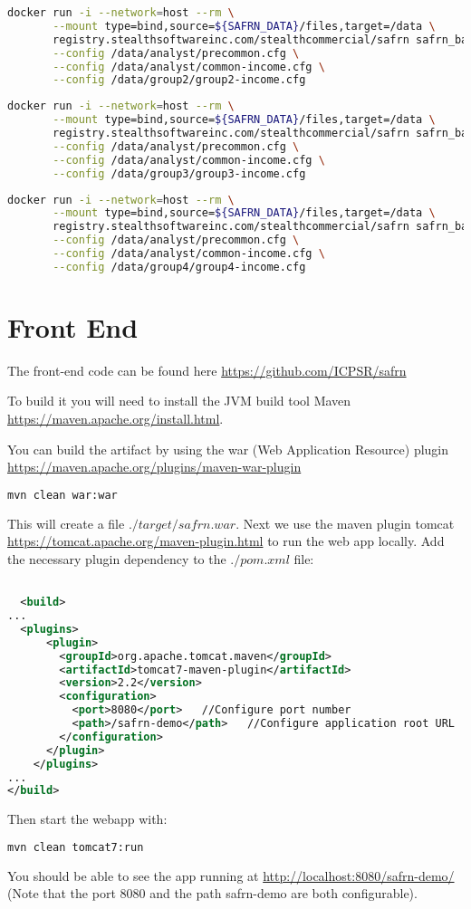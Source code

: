 \documentclass[12pt]{article}
\begin{document}
\begin{lstlisting}[language=sh]
docker run -i --network=host --rm \
       --mount type=bind,source=${SAFRN_DATA}/files,target=/data \
       registry.stealthsoftwareinc.com/stealthcommercial/safrn safrn_back_server \
       --config /data/analyst/precommon.cfg \
       --config /data/analyst/common-income.cfg \
       --config /data/group2/group2-income.cfg
\end{lstlisting}

\begin{lstlisting}[language=sh]
docker run -i --network=host --rm \
       --mount type=bind,source=${SAFRN_DATA}/files,target=/data \
       registry.stealthsoftwareinc.com/stealthcommercial/safrn safrn_back_server \
       --config /data/analyst/precommon.cfg \
       --config /data/analyst/common-income.cfg \
       --config /data/group3/group3-income.cfg
\end{lstlisting}
\begin{lstlisting}[language=sh]
docker run -i --network=host --rm \
       --mount type=bind,source=${SAFRN_DATA}/files,target=/data \
       registry.stealthsoftwareinc.com/stealthcommercial/safrn safrn_back_server \
       --config /data/analyst/precommon.cfg \
       --config /data/analyst/common-income.cfg \
       --config /data/group4/group4-income.cfg
\end{lstlisting}

\section{Front End}

The front-end code can be found here
\url{https://github.com/ICPSR/safrn}

To build it you will need to install the JVM build tool Maven
\url{https://maven.apache.org/install.html}.

You can build the artifact by using the war (Web Application Resource)
plugin \url{https://maven.apache.org/plugins/maven-war-plugin}

\begin{lstlisting}[language=sh]
mvn clean war:war
\end{lstlisting}

This will create a file $./target/safrn.war$. Next we use the maven
plugin tomcat \url{https://tomcat.apache.org/maven-plugin.html} to run
the web app locally. Add the necessary plugin dependency to the
$./pom.xml$ file:
\begin{lstlisting}[language=xml]

  <build>
...
  <plugins>
      <plugin>
        <groupId>org.apache.tomcat.maven</groupId>
        <artifactId>tomcat7-maven-plugin</artifactId>
        <version>2.2</version>
        <configuration>
          <port>8080</port>   //Configure port number
          <path>/safrn-demo</path>   //Configure application root URL
        </configuration>
      </plugin>
    </plugins>
...
</build>

\end{lstlisting}

Then start the webapp with:

\begin{lstlisting}[language=sh]
mvn clean tomcat7:run
\end{lstlisting}

You should be able to see the app running at
\url{http://localhost:8080/safrn-demo/} (Note that the port 8080 and
the path safrn-demo are both configurable).
\end{document}

